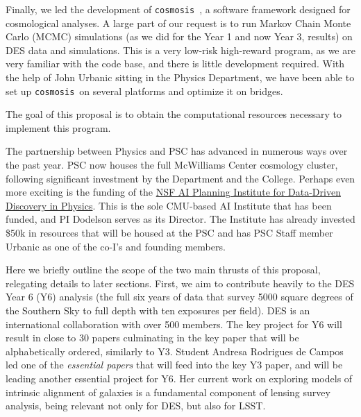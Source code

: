 \documentclass[12pt]{article}
\begin{document}
\begin{small}
\newcommand\cosmosis{{\tt cosmosis}}


Finally, we led the development of {\tt cosmosis}~\cite{Zuntz:2014csq}, a software framework designed for cosmological analyses. A large part of our request is to run Markov Chain Monte Carlo (MCMC) simulations (as we did for the Year 1 and now Year 3, results) on DES data and simulations. This is a very low-risk high-reward program, as we are very familiar with the code base, and there is little development required. With the help of John Urbanic sitting in the Physics Department, we have been able to set up \cosmosis\ on several platforms and optimize it on bridges.

The goal of this proposal is to obtain the computational resources necessary to implement this program.

The partnership between Physics and PSC has advanced in numerous ways over the past year. PSC now houses the full McWilliams Center cosmology cluster, following significant investment by the Department and the College. Perhaps even more exciting is the funding of the \href{https://www.cmu.edu/ai-physics-institute/}{NSF AI Planning Institute for Data-Driven Discovery in Physics}. This is the sole CMU-based AI Institute that has been funded, and PI Dodelson serves as its Director. The Institute has already invested \$50k in resources that will be housed at the PSC and has PSC Staff member Urbanic as one of the co-I's and founding members. 


Here we briefly outline the scope of the two main thrusts of this proposal, relegating details to later sections. First, we aim to contribute heavily to the DES Year 6 (Y6) analysis (the full six years of data that survey 5000 square degrees of the Southern Sky to full depth with ten exposures per field). DES is an international collaboration with over 500 members. The key project for Y6 will result in close to 30 papers culminating in the key paper that will be alphabetically ordered, similarly to Y3. 
Student Andresa Rodrigues de Campos led one of the {\it essential papers} \cite{y3-tensions} that will feed into the key Y3 paper, and will be leading another essential project for Y6. Her current work on exploring models of intrinsic alignment of galaxies is a fundamental component of lensing survey analysis, being relevant not only for DES, but also for LSST.

\end{small}
\end{document}
